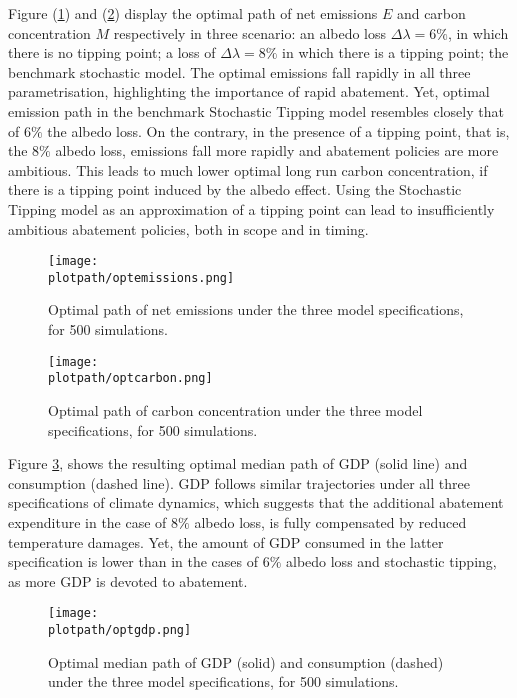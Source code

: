\documentclass[../../main.tex]{subfiles}
\begin{document}
Figure (\ref{fig:optimal:emissions}) and (\ref{fig:optimal:carbon concentration}) display the optimal path of net emissions $E$ and carbon concentration $M$ respectively in three scenario: an albedo loss $\Delta\lambda = 6\%$, in which there is no tipping point; a loss of $\Delta\lambda = 8\%$ in which there is a tipping point; the benchmark stochastic model. The optimal emissions fall rapidly in all three parametrisation, highlighting the importance of rapid abatement. Yet, optimal emission path in the benchmark Stochastic Tipping model resembles closely that of $6\%$ the albedo loss. On the contrary, in the presence of a tipping point, that is, the $8\%$ albedo loss, emissions fall more rapidly and abatement policies are more ambitious. This leads to much lower optimal long run carbon concentration, if there is a tipping point induced by the albedo effect. Using the Stochastic Tipping model as an approximation of a tipping point can lead to insufficiently ambitious abatement policies, both in scope and in timing.

\begin{figure}[H]
    \centering
    \texttt{[image: \\plotpath/optemissions.png]}
    \caption{Optimal path of net emissions under the three model specifications, for 500 simulations.}
    \label{fig:optimal:emissions}
\end{figure}

\begin{figure}[H]
    \centering
    \texttt{[image: \\plotpath/optcarbon.png]}
    \caption{Optimal path of carbon concentration under the three model specifications, for 500 simulations.}
    \label{fig:optimal:carbon concentration}
\end{figure}

Figure \ref{fig:optimal:gdp}, shows the resulting optimal median path of GDP (solid line) and consumption (dashed line). GDP follows similar trajectories under all three specifications of climate dynamics, which suggests that the additional abatement expenditure in the case of $8\%$ albedo loss, is fully compensated by reduced temperature damages. Yet, the amount of GDP consumed in the latter specification is lower than in the cases of $6\%$ albedo loss and stochastic tipping, as more GDP is devoted to abatement.

\begin{figure}[H]
    \centering
    \texttt{[image: \\plotpath/optgdp.png]}
    \caption{Optimal median path of GDP (solid) and consumption (dashed) under the three model specifications, for 500 simulations.}
    \label{fig:optimal:gdp}
\end{figure}
\end{document}
